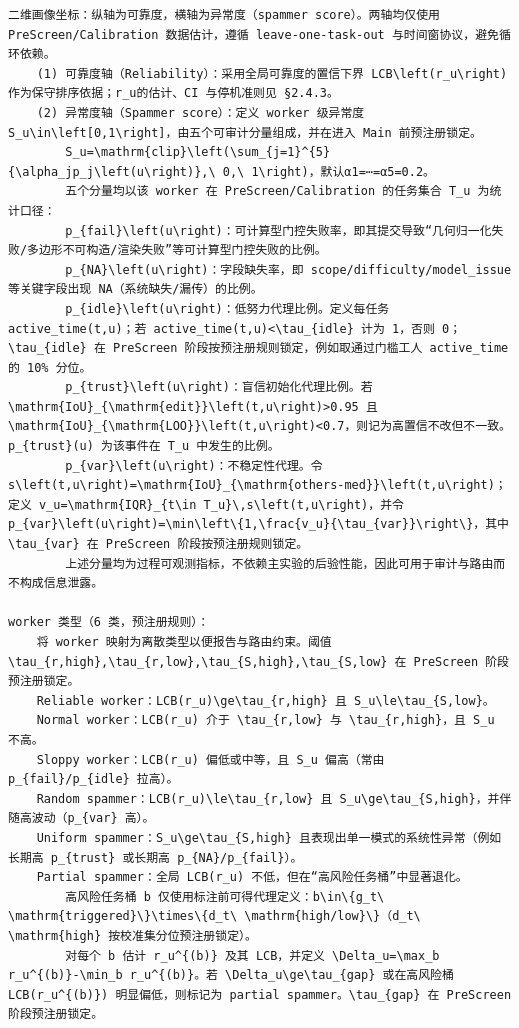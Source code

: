 \documentclass[a4paper,12pt]{article}
\begin{document}
\begin{Verbatim}[fontsize=\small,breaklines=true,breakanywhere=true]
二维画像坐标：纵轴为可靠度，横轴为异常度（spammer score）。两轴均仅使用 PreScreen/Calibration 数据估计，遵循 leave-one-task-out 与时间窗协议，避免循环依赖。
	(1) 可靠度轴（Reliability）：采用全局可靠度的置信下界 LCB\left(r_u\right) 作为保守排序依据；r_u的估计、CI 与停机准则见 §2.4.3。
	(2) 异常度轴（Spammer score）：定义 worker 级异常度 S_u\in\left[0,1\right]，由五个可审计分量组成，并在进入 Main 前预注册锁定。
		S_u=\mathrm{clip}\left(\sum_{j=1}^{5}{\alpha_jp_j\left(u\right)},\ 0,\ 1\right)，默认α1=⋯=α5=0.2。
		五个分量均以该 worker 在 PreScreen/Calibration 的任务集合 T_u 为统计口径：
		p_{fail}\left(u\right)：可计算型门控失败率，即其提交导致“几何归一化失败/多边形不可构造/渲染失败”等可计算型门控失败的比例。
		p_{NA}\left(u\right)：字段缺失率，即 scope/difficulty/model_issue 等关键字段出现 NA（系统缺失/漏传）的比例。
		p_{idle}\left(u\right)：低努力代理比例。定义每任务 active_time(t,u)；若 active_time(t,u)<\tau_{idle} 计为 1，否则 0；\tau_{idle} 在 PreScreen 阶段按预注册规则锁定，例如取通过门槛工人 active_time 的 10% 分位。
		p_{trust}\left(u\right)：盲信初始化代理比例。若 \mathrm{IoU}_{\mathrm{edit}}\left(t,u\right)>0.95 且 \mathrm{IoU}_{\mathrm{LOO}}\left(t,u\right)<0.7，则记为高置信不改但不一致。p_{trust}(u) 为该事件在 T_u 中发生的比例。
		p_{var}\left(u\right)：不稳定性代理。令 s\left(t,u\right)=\mathrm{IoU}_{\mathrm{others-med}}\left(t,u\right)；定义 v_u=\mathrm{IQR}_{t\in T_u}\,s\left(t,u\right)，并令 p_{var}\left(u\right)=\min\left\{1,\frac{v_u}{\tau_{var}}\right\}，其中 \tau_{var} 在 PreScreen 阶段按预注册规则锁定。
		上述分量均为过程可观测指标，不依赖主实验的后验性能，因此可用于审计与路由而不构成信息泄露。

worker 类型（6 类，预注册规则）：
	将 worker 映射为离散类型以便报告与路由约束。阈值 \tau_{r,high},\tau_{r,low},\tau_{S,high},\tau_{S,low} 在 PreScreen 阶段预注册锁定。
	Reliable worker：LCB(r_u)\ge\tau_{r,high} 且 S_u\le\tau_{S,low}。
	Normal worker：LCB(r_u) 介于 \tau_{r,low} 与 \tau_{r,high}，且 S_u 不高。
	Sloppy worker：LCB(r_u) 偏低或中等，且 S_u 偏高（常由 p_{fail}/p_{idle} 拉高）。
	Random spammer：LCB(r_u)\le\tau_{r,low} 且 S_u\ge\tau_{S,high}，并伴随高波动（p_{var} 高）。
	Uniform spammer：S_u\ge\tau_{S,high} 且表现出单一模式的系统性异常（例如长期高 p_{trust} 或长期高 p_{NA}/p_{fail}）。
	Partial spammer：全局 LCB(r_u) 不低，但在“高风险任务桶”中显著退化。
		高风险任务桶 b 仅使用标注前可得代理定义：b\in\{g_t\ \mathrm{triggered}\}\times\{d_t\ \mathrm{high/low}\}（d_t\ \mathrm{high} 按校准集分位预注册锁定）。
		对每个 b 估计 r_u^{(b)} 及其 LCB，并定义 \Delta_u=\max_b r_u^{(b)}-\min_b r_u^{(b)}。若 \Delta_u\ge\tau_{gap} 或在高风险桶 LCB(r_u^{(b)}) 明显偏低，则标记为 partial spammer。\tau_{gap} 在 PreScreen 阶段预注册锁定。


\end{Verbatim}
\end{document}

